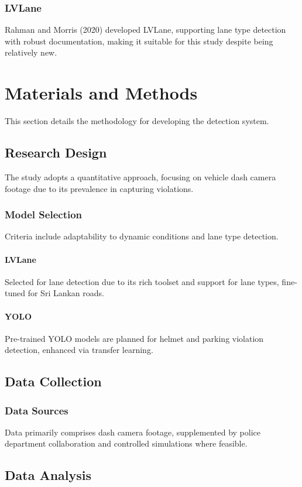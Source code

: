 \documentclass[12pt,a4paper]{article}
\begin{document}
\subsubsection{LVLane}
Rahman and Morris (2020) developed LVLane, supporting lane type detection with robust documentation, making it suitable for this study despite being relatively new.

\section{Materials and Methods}
This section details the methodology for developing the detection system.

\subsection{Research Design}
The study adopts a quantitative approach, focusing on vehicle dash camera footage due to its prevalence in capturing violations.

\subsubsection{Model Selection}
Criteria include adaptability to dynamic conditions and lane type detection.

\paragraph{LVLane}
Selected for lane detection due to its rich toolset and support for lane types, fine-tuned for Sri Lankan roads.

\paragraph{YOLO}
Pre-trained YOLO models are planned for helmet and parking violation detection, enhanced via transfer learning.

\subsection{Data Collection}
\subsubsection{Data Sources}
Data primarily comprises dash camera footage, supplemented by police department collaboration and controlled simulations where feasible.

\subsection{Data Analysis}
\end{document}
